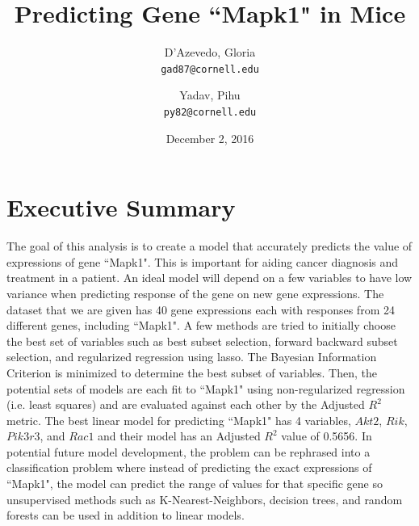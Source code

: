\documentclass{article}
\title{Predicting Gene ``Mapk1" in Mice}
\author{
  D'Azevedo, Gloria\\
  \texttt{gad87@cornell.edu}
  \and
  Yadav, Pihu\\
  \texttt{py82@cornell.edu}
}
\date{December 2, 2016}
\begin{document}
\maketitle

\tableofcontents

\section{Executive Summary}
The goal of this analysis is to create a model that accurately predicts the value of expressions of gene ``Mapk1".  This is important for aiding cancer diagnosis and treatment in a patient.  An ideal model will depend on a few variables to have low variance when predicting response of the gene on new gene expressions.  The dataset that we are given has 40 gene expressions each with responses from 24 different genes, including ``Mapk1".  A few methods are tried to initially choose the best set of variables such as best subset selection, forward backward subset selection, and regularized regression using lasso.  The Bayesian Information Criterion is minimized to determine the best subset of variables.  Then, the potential sets of models are each fit to ``Mapk1" using non-regularized regression (i.e. least squares) and are evaluated against each other by the Adjusted $R^2$ metric.  The best linear model for predicting ``Mapk1" has 4 variables, $Akt2$, $Rik$, $Pik3r3$, and $Rac1$ and their model has an Adjusted $R^2$ value of 0.5656.  In potential future model development, the problem can be rephrased into a classification problem where instead of predicting the exact expressions of ``Mapk1", the model can predict the range of values for that specific gene so unsupervised methods such as K-Nearest-Neighbors, decision trees, and random forests can be used in addition to linear models.
\end{document}
